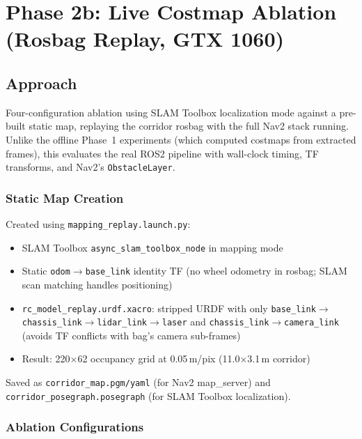 \documentclass[11pt,a4paper]{article}
\begin{document}
\section{Phase 2b: Live Costmap Ablation (Rosbag Replay, GTX 1060)}
\label{sec:phase2b}

\subsection{Approach}

Four-configuration ablation using SLAM Toolbox localization mode against a
pre-built static map, replaying the corridor rosbag with the full Nav2 stack
running.  Unlike the offline Phase~1 experiments (which computed costmaps
from extracted frames), this evaluates the real ROS2 pipeline with
wall-clock timing, TF transforms, and Nav2's \texttt{ObstacleLayer}.

\subsubsection{Static Map Creation}

Created using \texttt{mapping\_replay.launch.py}:
\begin{itemize}[nosep]
  \item SLAM Toolbox \texttt{async\_slam\_toolbox\_node} in mapping mode
  \item Static \texttt{odom}$\to$\texttt{base\_link} identity TF
    (no wheel odometry in rosbag; SLAM scan matching handles positioning)
  \item \texttt{rc\_model\_replay.urdf.xacro}: stripped URDF with only
    \texttt{base\_link}$\to$\texttt{chassis\_link}$\to$\texttt{lidar\_link}$\to$\texttt{laser}
    and \texttt{chassis\_link}$\to$\texttt{camera\_link} (avoids TF conflicts
    with bag's camera sub-frames)
  \item Result: 220$\times$62 occupancy grid at 0.05\,m/pix
    (11.0$\times$3.1\,m corridor)
\end{itemize}

Saved as \texttt{corridor\_map.pgm/yaml} (for Nav2 map\_server) and
\texttt{corridor\_posegraph.posegraph} (for SLAM Toolbox localization).

\subsubsection{Ablation Configurations}
\end{document}
